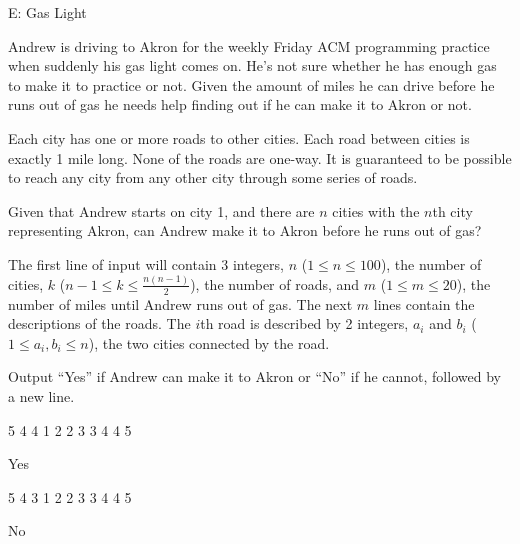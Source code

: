 \begin{problem}{E: Gas Light}

Andrew is driving to Akron for the weekly Friday ACM programming practice when suddenly his gas light comes on.
He's not sure whether he has enough gas to make it to practice or not.
Given the amount of miles he can drive before he runs out of gas he needs help finding out if he can make it to Akron or not.

Each city has one or more roads to other cities.
Each road between cities is exactly 1 mile long.
None of the roads are one-way.
It is guaranteed to be possible to reach any city from any other city through some series of roads.

Given that Andrew starts on city 1, and there are $n$ cities with the $n$th city representing Akron, can Andrew make it to Akron before he runs out of gas?
\end{problem}

\begin{formalin}
The first line of input will contain 3 integers, $n$ ($1 \leq n \leq 100$), the number of cities, $k$ ($n - 1 \leq k \leq \frac {n(n-1)}{2}$), the number of roads, and $m$ ($1 \leq m \leq 20$), the number of miles until Andrew runs out of gas.
The next $m$ lines contain the descriptions of the roads.
The $i$th road is described by 2 integers, $a_i$ and $b_i$ ($1 \leq a_i, b_i \leq n$), the two cities connected by the road.
\end{formalin}

\begin{formalout}
Output ``Yes'' if Andrew can make it to Akron or ``No'' if he cannot, followed by a new line.
\end{formalout}

\begin{datain}
5 4 4
1 2
2 3
3 4
4 5
\end{datain}
\begin{dataout}
Yes
\end{dataout}

\begin{datain}
5 4 3
1 2
2 3
3 4
4 5
\end{datain}
\begin{dataout}
No
\end{dataout}
